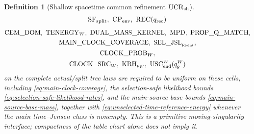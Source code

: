\documentclass[11pt]{article}
\newtheorem{definition}[theorem]{Definition}
\begin{document}
\begin{definition}[Shallow spacetime common refinement
$\mathrm{UCR}_{\rm sh}$]
\[\begin{gathered}
 \mathrm{SF}_{\rm split},\ \mathrm{CP}_{\rm env},\
 \mathrm{REC}(q_{\rm rec})
 \end{gathered}
\]
\[
 \begin{gathered}
 \mathrm{CEM\_DOM},\ \mathrm{TENERGY}_{W},\
 \mathrm{DUAL\_MASS\_KERNEL},\ \mathrm{MPD},\
 \mathrm{PROP\_Q\_MATCH},\\
 \mathrm{MAIN\_CLOCK\_COVERAGE},\
 \mathrm{SEL\_JSL}_{p_{\rm joint}},\\
 \mathrm{CLOCK\_PROB}_{W},\\
 \mathrm{CLOCK\_SRC}_{W},\ \mathrm{KRH}_{p_W},\
 \mathrm{USC}_{\rm end}^{W}(q_g^W)
 \end{gathered}
\]
on the complete actual/split tree laws are required to be uniform on these
cells, including \eqref{eq:main-clock-coverage}, the selection-safe
likelihood bounds \eqref{eq:selection-safe-likelihood-rates}, and the
main-source base bounds \eqref{eq:main-source-base-mass}, together with
\eqref{eq:unselected-time-reference-energy} whenever the main time--Jensen
class is nonempty.
This is a primitive moving-singularity interface; compactness of the table
chart alone does not imply it.
\end{definition}
\end{document}
